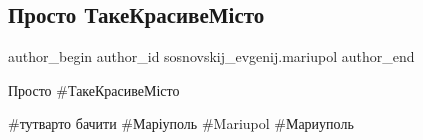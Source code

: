  
 
 
 
 

\subsection{Просто ТакеКрасивеМісто}
\label{sec:02_10_2021.fb.sosnovskij_evgenij.mariupol.1.prosto_takekrasivem_}

\ifcmt
 author_begin
   author_id sosnovskij_evgenij.mariupol
 author_end
\fi

Просто \#ТакеКрасивеМісто

\#тутварто бачити \#Маріуполь \#Mariupol \#Мариуполь

